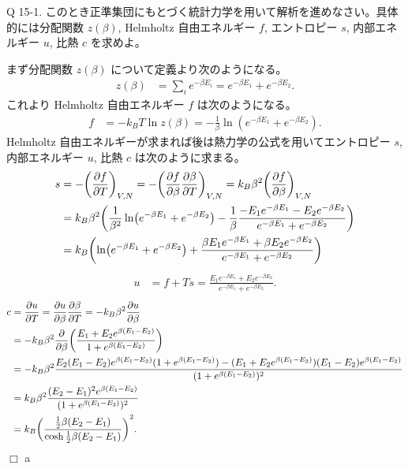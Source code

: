 \documentclass[uplatex,dvipdfmx,a4paper,11pt]{jlreq}
\theoremstyle{definition}
\begin{document}
\begin{itembox}[l]{Q 15-1.}
  このとき正準集団にもとづく統計力学を用いて解析を進めなさい。具体的には分配関数 $z(\beta)$, Helmholtz 自由エネルギー $f$, エントロピー $s$, 内部エネルギー $u$, 比熱 $c$ を求めよ。
\end{itembox}

まず分配関数 $z(\beta)$ について定義より次のようになる。
\begin{align}
  z(\beta) & = \sum_{i} e^{-\beta E_i} = e^{-\beta E_1} + e^{-\beta E_2}.
\end{align}
これより Helmholtz 自由エネルギー $f$ は次のようになる。
\begin{align}
  f & = -k_BT\ln z(\beta) = -\frac{1}{\beta}\ln(e^{-\beta E_1} + e^{-\beta E_2}).
\end{align}
Helmholtz 自由エネルギーが求まれば後は熱力学の公式を用いてエントロピー $s$, 内部エネルギー $u$, 比熱 $c$ は次のように求まる。
\begin{align}
  s & = - \qty(\pdv{f}{T})_{V,N} = - \qty(\pdv{f}{\beta}\pdv{\beta}{T})_{V,N} = k_B\beta^2\qty(\pdv{f}{\beta})_{V,N}                                                          \\
    & = k_B\beta^2\qty(\frac{1}{\beta^2}\ln(e^{-\beta E_1} + e^{-\beta E_2}) - \frac{1}{\beta}\frac{-E_1e^{-\beta E_1} - E_2e^{-\beta E_2}}{e^{-\beta E_1} + e^{-\beta E_2}}) \\
    & = k_B\qty(\ln(e^{-\beta E_1} + e^{-\beta E_2}) + \frac{\beta E_1e^{-\beta E_1} + \beta E_2e^{-\beta E_2}}{e^{-\beta E_1} + e^{-\beta E_2}})
\end{align}
\begin{align}
  u & = f + Ts = \frac{E_1e^{-\beta E_1} + E_2e^{-\beta E_2}}{e^{-\beta E_1} + e^{-\beta E_2}}.
\end{align}
\begin{align}
  c & = \pdv{u}{T} = \pdv{u}{\beta}\pdv{\beta}{T} = -k_B\beta^2\pdv{u}{\beta}                                                                                                         \\
    & = -k_B\beta^2\pdv{\beta}\qty(\frac{E_1 + E_2e^{\beta(E_1 - E_2)}}{1 + e^{\beta(E_1 - E_2)}})                                                                                    \\
    & = -k_B\beta^2\frac{E_2(E_1 - E_2)e^{\beta(E_1 - E_2)}(1 + e^{\beta(E_1 - E_2)}) - (E_1 + E_2e^{\beta(E_1 - E_2)})(E_1 - E_2)e^{\beta(E_1 - E_2)}}{(1 + e^{\beta(E_1 - E_2)})^2} \\
    & = k_B\beta^2\frac{(E_2 - E_1)^2e^{\beta(E_1 - E_2)}}{(1 + e^{\beta(E_1 - E_2)})^2}                                                                                              \\
    & = k_B\qty(\frac{\frac{1}{2}\beta(E_2 - E_1)}{\cosh\frac{1}{2}\beta(E_2 - E_1)})^2.
\end{align}
$\Box$
a
\end{document}
